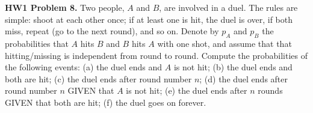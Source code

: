 \documentclass{article}
\newcommand{\E}{\mathbb{E}}
\begin{document}
%
%
%
%
%
%
%
%

\textbf{HW1 Problem 8.} Two people, \(A\) and \(B\), are involved in a duel. The rules are simple: shoot at each other once; if at least one is hit, the duel is over, if both miss, repeat (go to the next round), and so on. Denote by \(p_A\) and \(p_B\) the probabilities that \(A\) hits \(B\) and \(B\) hits \(A\) with one shot, and assume that that hitting/missing is independent from round to round. Compute the probabilities of the following events: (a) the duel ends and \(A\) is not hit; (b) the duel ends and both are hit; (c) the duel ends after round number \(n\); (d) the duel ends after round number \(n\) GIVEN that \(A\) is not hit; (e) the duel ends after \(n\) rounds GIVEN that both are hit; (f) the duel goes on forever.
\end{document}
